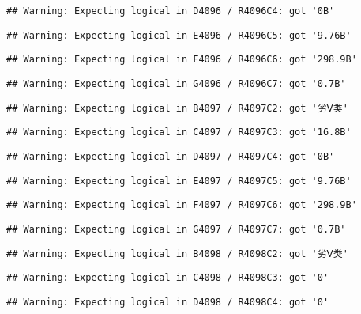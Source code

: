 \documentclass[
]{article}
\begin{document}
\begin{verbatim}
## Warning: Expecting logical in D4096 / R4096C4: got '0B'
\end{verbatim}

\begin{verbatim}
## Warning: Expecting logical in E4096 / R4096C5: got '9.76B'
\end{verbatim}

\begin{verbatim}
## Warning: Expecting logical in F4096 / R4096C6: got '298.9B'
\end{verbatim}

\begin{verbatim}
## Warning: Expecting logical in G4096 / R4096C7: got '0.7B'
\end{verbatim}

\begin{verbatim}
## Warning: Expecting logical in B4097 / R4097C2: got '劣Ⅴ类'
\end{verbatim}

\begin{verbatim}
## Warning: Expecting logical in C4097 / R4097C3: got '16.8B'
\end{verbatim}

\begin{verbatim}
## Warning: Expecting logical in D4097 / R4097C4: got '0B'
\end{verbatim}

\begin{verbatim}
## Warning: Expecting logical in E4097 / R4097C5: got '9.76B'
\end{verbatim}

\begin{verbatim}
## Warning: Expecting logical in F4097 / R4097C6: got '298.9B'
\end{verbatim}

\begin{verbatim}
## Warning: Expecting logical in G4097 / R4097C7: got '0.7B'
\end{verbatim}

\begin{verbatim}
## Warning: Expecting logical in B4098 / R4098C2: got '劣Ⅴ类'
\end{verbatim}

\begin{verbatim}
## Warning: Expecting logical in C4098 / R4098C3: got '0'
\end{verbatim}

\begin{verbatim}
## Warning: Expecting logical in D4098 / R4098C4: got '0'
\end{verbatim}
\end{document}
